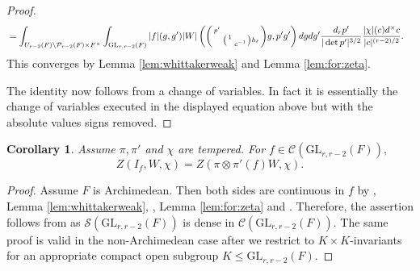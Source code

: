 \documentclass[12pt]{amsart}
\newtheorem{cor}[thm]{Corollary}
\theoremstyle{remark}
\numberwithin{equation}{section}
\newcommand{\GL}{\mathrm{GL}}
\newcommand{\quash}[1]{}
\theoremstyle{definition}
\newenvironment{psmatrix}
  {\left(\begin{smallmatrix}}
  {\end{smallmatrix}\right)}
\numberwithin{equation}{subsection}
\begin{document}
\begin{proof}
\begin{align*}
    &=\int_{U_{r-2}(F) \backslash \mathcal{P}_{r-2}(F) \times F^\times}\int_{\GL_{r,r-2}(F)}|f|(g,g')|W|\left(\begin{psmatrix} p' &  \\ & \begin{psmatrix} 1 & \\ & c^{-1}\end{psmatrix} h_\ell \end{psmatrix}g,p'g'\right)dgdg'\frac{d_r p' }{|\det p'|^{3/2}} \frac{|\chi|(c)d^\times c}{|c|^{(r-2)/2}}.
\end{align*}
This converges by  Lemma \ref{lem:whittakerweak} and Lemma \ref{lem:for:zeta}.
\quash{

In the non-Archimedean case, the Whittaker function $W$ is uniformly smooth under the action of $\GL_{r,r-2}(F),$ and hence Corollary \ref{cor:Z:conv} implies that the integral above is convergent for $\mathrm{Re}(\chi)>-\tfrac{1}{2}.$  The same is true in the Archimedean case, but one must use the fact that the estimate \eqref{gauge} may be taken to be uniform for $W$ in a compact subset of $\mathcal{W}(\pi,\psi) \widehat{\otimes} \mathcal{W}(\pi',\overline{\psi})$ by \cite[Proposition 3.5]{JacquetPerfectRS}.}



The identity  now follows from a change of variables. In fact it is essentially the change of variables executed in the displayed equation above but with the absolute values signs removed.  
 \end{proof}

\begin{cor}\label{cor:tempered:ZW=ZfW}
    Assume $\pi,\pi'$ and $\chi$ are tempered. For $f\in \mathcal{C}(\GL_{r,r-2}(F)),$ 
$$
Z(I_{f},W,\chi)=Z(\pi \otimes \pi'(f)W,\chi).$$
\end{cor}

\begin{proof}
    Assume $F$ is Archimedean.  Then both sides are continuous in $f$ by , Lemma \ref{lem:whittakerweak}, , Lemma \ref{lem:for:zeta} and . Therefore, the assertion follows from  as $\mathcal{S}(\GL_{r,r-2}(F))$ is dense in $\mathcal{C}(\GL_{r,r-2}(F)).$  The same proof is valid in the non-Archimedean case after we restrict to $K \times K$-invariants for an appropriate compact open subgroup $K \leq \GL_{r,r-2}(F).$
\end{proof}
\end{document}
